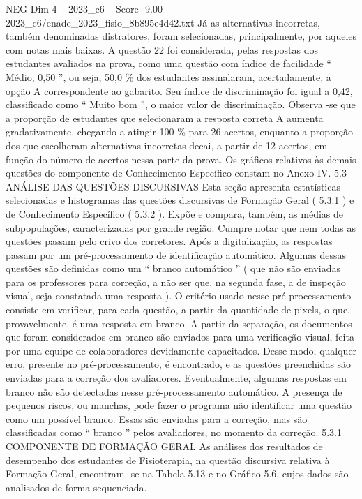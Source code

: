 \begin{textsample}{NEG Dim 4 – 2023\_c6 – Score -9.00 – 2023\_c6/enade\_2023\_fisio\_8b895e4d42.txt}
Já as alternativas incorretas, também denominadas distratores, foram selecionadas, principalmente, por aqueles com notas mais baixas.
A questão 22 foi considerada, pelas respostas dos estudantes avaliados na prova, como uma questão com índice de facilidade “ Médio, 0,50 ”, ou seja, 50,0 \% dos estudantes assinalaram, acertadamente, a opção A correspondente ao gabarito.
Seu índice de discriminação foi igual a 0,42, classificado como “ Muito bom ”, o maior valor de discriminação.
Observa -se que a proporção de estudantes que selecionaram a resposta correta A aumenta gradativamente, chegando a atingir 100 \% para 26 acertos, enquanto a proporção dos que escolheram alternativas incorretas decai, a partir de 12 acertos, em função do número de acertos nessa parte da prova.
Os gráficos relativos às demais questões do componente de Conhecimento Específico constam no Anexo IV. 5.3 ANÁLISE DAS QUESTÕES DISCURSIVAS Esta seção apresenta estatísticas selecionadas e histogramas das questões discursivas de Formação Geral ( 5.3.1 ) e de Conhecimento Específico ( 5.3.2 ).
Expõe e compara, também, as médias de subpopulações, caracterizadas por grande região.
Cumpre notar que nem todas as questões passam pelo crivo dos corretores.
Após a digitalização, as respostas passam por um pré-processamento de identificação automático.
Algumas dessas questões são definidas como um “ branco automático ” ( que não são enviadas para os professores para correção, a não ser que, na segunda fase, a de inspeção visual, seja constatada uma resposta ).
O critério usado nesse pré-processamento consiste em verificar, para cada questão, a partir da quantidade de pixels, o que, provavelmente, é uma resposta em branco.
A partir da separação, os documentos que foram considerados em branco são enviados para uma verificação visual, feita por uma equipe de colaboradores devidamente capacitados.
Desse modo, qualquer erro, presente no pré-processamento, é encontrado, e as questões preenchidas são enviadas para a correção dos avaliadores.
Eventualmente, algumas respostas em branco não são detectadas nesse pré-processamento automático.
A presença de pequenos riscos, ou manchas, pode fazer o programa não identificar uma questão como um possível branco.
Essas são enviadas para a correção, mas são classificadas como “ branco ” pelos avaliadores, no momento da correção. 5.3.1 COMPONENTE DE FORMAÇÃO GERAL As análises dos resultados de desempenho dos estudantes de Fisioterapia, na questão discursiva relativa à Formação Geral, encontram -se na Tabela 5.13 e no Gráfico 5.6, cujos dados são analisados de forma sequenciada.

\end{textsample}
